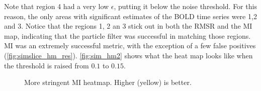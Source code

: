 Note that region 4 had a very low $\epsilon$, putting it below the noise
threshold. For this reason, the only areas
with significant estimates of the \ac{BOLD} time series were 1,2 and 3.
Notice that the
regions 1, 2 an 3 stick out in both the \ac{RMSR} and the \ac{MI}
map, indicating that the particle filter was successful in matching those regions.
\ac{MI} was an extremely successful metric, with the exception of
a few false positives (\autoref{fig:simslice_hm_res}). 
\autoref{fig:sim_hm2} shows what the heat map looks
like when the threshold is raised from $0.1$ to $0.15$.
\begin{figure}
\centering
{}
\caption{More stringent \acs{MI} heatmap. Higher (yellow) is better.}
\label{fig:sim_hm2}
\end{figure}

